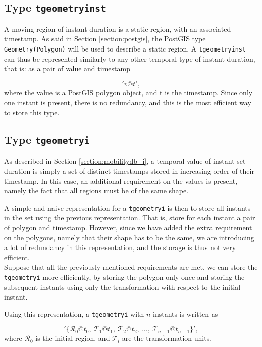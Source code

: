 \subsection{Type \texttt{tgeometryinst}}
\label{section:internal_repr_inst}

A moving region of instant duration is a static region, with an associated timestamp. As said in Section \ref{section:postgis}, the PostGIS type \lstinline{Geometry(Polygon)} will be used to describe a static region. A \lstinline{tgeometryinst} can thus be represented similarly to any other temporal type of instant duration, that is: as a pair of value and timestamp

\[
    'v@t', 
\]
where the value is a PostGIS polygon object, and t is the timestamp. Since only one instant is present, there is no redundancy, and this is the most efficient way to store this type.

\subsection{Type \texttt{tgeometryi}}
\label{section:internal_repr_i}

As described in Section \ref{section:mobilitydb_i}, a temporal value of instant set duration is simply a set of distinct timestamps stored in increasing order of their timestamp. In this case, an additional requirement on the values is present, namely the fact that all regions must be of the same shape.

A simple and naive representation for a \lstinline{tgeometryi} is then to store all instants in the set using the previous representation. That is, store for each instant a pair of polygon and timestamp. However, since we have added the extra requirement on the polygons, namely that their shape has to be the same, we are introducing a lot of redundancy in this representation, and the storage is thus not very efficient. \\

Suppose that all the previously mentioned requirements are met, we can store the \lstinline{tgeometryi}  more efficiently, by storing the polygon only once and storing the subsequent instants using only the transformation with respect to the initial instant. 

Using this representation, a \lstinline{tgeometryi} with $n$ instants is written as

\[
    '\{\mathcal{R}_0@t_0,\ \mathcal{T}_1@t_1,\ \mathcal{T}_2@t_2,\ ..., \ \mathcal{T}_{n-1}@t_{n-1}\}', 
\]
where $\mathcal{R}_0$ is the initial region, and $\mathcal{T}_i$ are the transformation units. \\

